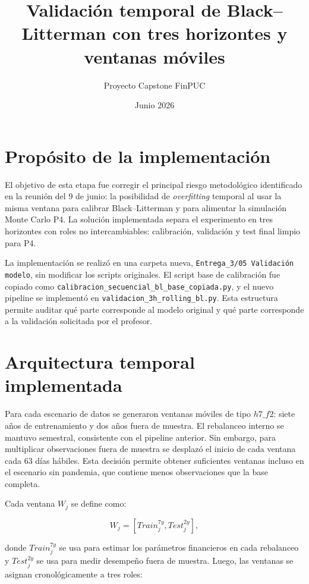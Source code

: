 \documentclass[11pt]{article}
\title{Validaci\'on temporal de Black--Litterman con tres horizontes y ventanas m\'oviles}
\author{Proyecto Capstone FinPUC}
\date{Junio 2026}
\begin{document}
\maketitle

\section{Prop\'osito de la implementaci\'on}

El objetivo de esta etapa fue corregir el principal riesgo metodol\'ogico identificado en la reuni\'on del 9 de junio: la posibilidad de \textit{overfitting} temporal al usar la misma ventana para calibrar Black--Litterman y para alimentar la simulaci\'on Monte Carlo P4. La soluci\'on implementada separa el experimento en tres horizontes con roles no intercambiables: calibraci\'on, validaci\'on y test final limpio para P4.

La implementaci\'on se realiz\'o en una carpeta nueva, \texttt{Entrega\_3/05 Validaci\'on modelo}, sin modificar los scripts originales. El script base de calibraci\'on fue copiado como \texttt{calibracion\_secuencial\_bl\_base\_copiada.py}, y el nuevo pipeline se implement\'o en \texttt{validacion\_3h\_rolling\_bl.py}. Esta estructura permite auditar qu\'e parte corresponde al modelo original y qu\'e parte corresponde a la validaci\'on solicitada por el profesor.

\section{Arquitectura temporal implementada}

Para cada escenario de datos se generaron ventanas m\'oviles de tipo $h7\_f2$: siete a\~nos de entrenamiento y dos a\~nos fuera de muestra. El rebalanceo interno se mantuvo semestral, consistente con el pipeline anterior. Sin embargo, para multiplicar observaciones fuera de muestra se desplaz\'o el inicio de cada ventana cada 63 d\'ias h\'abiles. Esta decisi\'on permite obtener suficientes ventanas incluso en el escenario sin pandemia, que contiene menos observaciones que la base completa.

Cada ventana $W_j$ se define como:

\[
W_j = \left[Train_j^{7y}, Test_j^{2y}\right],
\]

donde $Train_j^{7y}$ se usa para estimar los par\'ametros financieros en cada rebalanceo y $Test_j^{2y}$ se usa para medir desempe\~no fuera de muestra. Luego, las ventanas se asignan cronol\'ogicamente a tres roles:
\end{document}
